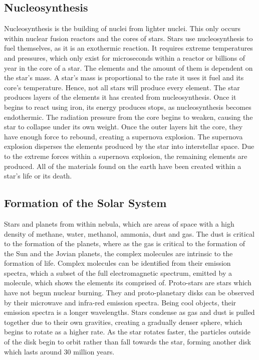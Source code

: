 \documentclass[12pt]{article}
\begin{document}
	\subsection{Nucleosynthesis}
	Nucleosynthesis is the building of nuclei from lighter nuclei.
	This only occurs within nuclear fusion reactors and the cores of stars.
	Stars use nucleosynthesis to fuel themselves, as it is an exothermic reaction.
	It requires extreme temperatures and pressures, which only exist for microseconds within a reactor or billions of year in the core of a star.
	The elements and the amount of them is dependent on the star's mass.
	A star's mass is proportional to the rate it uses it fuel and its core's temperature.
	Hence, not all stars will produce every element.
	The star produces layers of the elements it has created from nucleosynthesis.
	Once it begins to react using iron, its energy produces stops, as nucleosynthesis becomes endothermic.
	The radiation pressure from the core begins to weaken, causing the star to collapse under its own weight.
	Once the outer layers hit the core, they have enough force to rebound, creating a supernova explosion.
	The supernova explosion disperses the elements produced by the star into interstellar space.
	Due to the extreme forces within a supernova explosion, the remaining elements are produced.
	All of the materials found on the earth have been created within a star's life or its death.
	
	\subsection{Formation of the Solar System}
	Stars and planets from within nebula, which are areas of space with a high density of methane, water, methanol, ammonia, dust and gas.
	The dust is critical to the formation of the planets, where as the gas is critical to the formation of the Sun and the Jovian planets, the complex molecules are intrinsic to the formation of life.
	Complex molecules can be identified from their emission spectra, which a subset of the full electromagnetic spectrum, emitted by a molecule, which shows the elements its comprised of.
	Proto-stars are stars which have not begun nuclear burning.
	They and proto-planetary disks can be observed by their microwave and infra-red emission spectra.
	Being cool objects, their emission spectra is a longer wavelengths.
	Stars condense as gas and dust is pulled together due to their own gravities, creating a gradually denser sphere, which begins to rotate as a higher rate.
	As the star rotates faster, the particles outside of the disk begin to orbit rather than fall towards the star, forming another disk which lasts around 30 million years.
\end{document}
